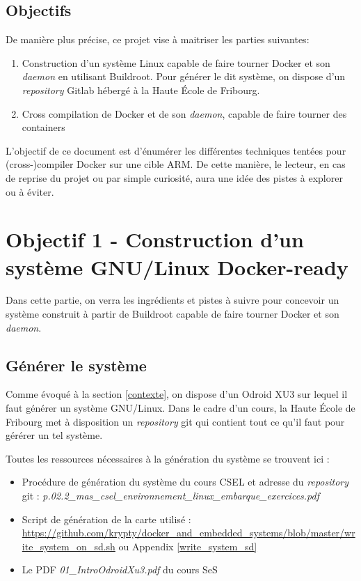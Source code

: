 \documentclass[11pt,a4paper,oneside]{report}
\begin{document}
\section{Objectifs}

De manière plus précise, ce projet vise à maitriser les parties suivantes:

\begin{enumerate}
  \item Construction d'un système Linux capable de faire tourner Docker et son \emph{daemon} en utilisant Buildroot. Pour générer le dit système, on dispose d'un \emph{repository} Gitlab hébergé à la Haute École de Fribourg.

  \item Cross compilation de Docker et de son \emph{daemon}, capable de faire tourner des containers
\end{enumerate}

L'objectif de ce document est d'énumérer les différentes techniques tentées pour (cross-)compiler Docker sur une cible ARM. De cette manière, le lecteur, en cas de reprise du projet ou par simple curiosité, aura une idée des pistes à explorer ou à éviter.



\chapter{Objectif 1 - Construction d'un système GNU/Linux Docker-ready}

Dans cette partie, on verra les ingrédients et pistes à suivre pour concevoir un système construit à partir de Buildroot capable de faire tourner Docker et son \emph{daemon}.

\section{Générer le système}

Comme évoqué à la section \ref{contexte}, on dispose d'un Odroid XU3 sur lequel il faut générer un système GNU/Linux. Dans le cadre d'un cours, la Haute École de Fribourg met à disposition un \emph{repository} git qui contient tout ce qu'il faut pour gérérer un tel système.

Toutes les ressources nécessaires à la génération du système se trouvent ici :

\begin{itemize}
  \item Procédure de génération du système du cours CSEL et adresse du \textit{repository} git : \emph{\newline p.02.2\_mas\_csel\_environnement\_linux\_embarque\_exercices.pdf}
  \item Script de génération de la carte utilisé : \url{https://github.com/krypty/docker\_and\_embedded\_systems/blob/master/write\_system\_on\_sd.sh} ou Appendix \ref{write_system_sd}
  \item Le PDF \emph{01\_IntroOdroidXu3.pdf} du cours SeS
\end{itemize}
\end{document}
